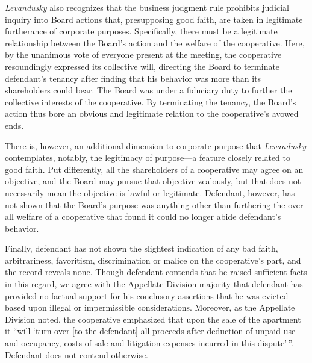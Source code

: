
\textit{Levandusky} also recognizes that the business judgment rule prohibits
judicial inquiry into Board actions that, presupposing good faith, are taken in
legitimate furtherance of corporate purposes. Specifically, there must be a
legitimate relationship between the Board's action and the welfare of the
cooperative. Here, by the unanimous vote of everyone present at the meeting, the
cooperative resoundingly expressed its collective will, directing the Board to
terminate defendant's tenancy after finding that his behavior was more than its
shareholders could bear. The Board was under a fiduciary duty to further the
collective interests of the cooperative. By terminating the tenancy, the Board's
action thus bore an obvious and legitimate relation to the cooperative's avowed
ends.

There is, however, an additional dimension to corporate purpose that
\textit{Levandusky} contemplates, notably, the legitimacy of purpose---a feature
closely related to good faith. Put differently, all the shareholders of a
cooperative may agree on an objective, and the Board may pursue that objective
zealously, but that does not necessarily mean the objective is lawful or
legitimate. Defendant, however, has not shown that the Board's purpose was
anything other than furthering the over-all welfare of a cooperative that found
it could no longer abide defendant's behavior. 



Finally, defendant has not shown the slightest indication of any bad faith,
arbitrariness, favoritism, discrimination or malice on the cooperative's part,
and the record reveals none. Though defendant contends that he raised sufficient
facts in this regard, we agree with the Appellate Division majority that
defendant has provided no factual support for his conclusory assertions that he
was evicted based upon illegal or impermissible considerations. Moreover, as the
Appellate Division noted, the cooperative emphasized that upon the sale of the
apartment it ``will `turn over [to the defendant] all proceeds after deduction
of unpaid use and occupancy, costs of sale and litigation expenses incurred in
this dispute'\,''. Defendant does not contend otherwise.

